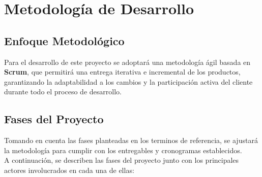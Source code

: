 \section{Metodología de Desarrollo}

\subsection{Enfoque Metodológico}

Para el desarrollo de este proyecto se adoptará una metodología ágil basada en \textbf{Scrum}, que permitirá una entrega iterativa e incremental de los productos, garantizando la adaptabilidad a los cambios y la participación activa del cliente durante todo el proceso de desarrollo.

\subsection{Fases del Proyecto}

Tomando en cuenta las fases planteadas en los terminos de referencia, se ajustará la metodología para cumplir con los entregables y cronogramas establecidos.\\
A continuación, se describen las fases del proyecto junto con los principales actores involucrados en cada una de ellas:


